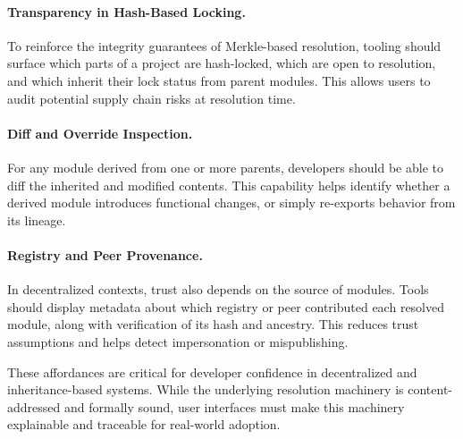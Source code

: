 \documentclass[sigplan,screen]{acmart}
\begin{document}
\paragraph{Transparency in Hash-Based Locking.}
To reinforce the integrity guarantees of Merkle-based resolution, tooling should surface which parts of a project are hash-locked, which are open to resolution, and which inherit their lock status from parent modules. This allows users to audit potential supply chain risks at resolution time.

\paragraph{Diff and Override Inspection.}
For any module derived from one or more parents, developers should be able to diff the inherited and modified contents. This capability helps identify whether a derived module introduces functional changes, or simply re-exports behavior from its lineage.

\paragraph{Registry and Peer Provenance.}
In decentralized contexts, trust also depends on the source of modules. Tools should display metadata about which registry or peer contributed each resolved module, along with verification of its hash and ancestry. This reduces trust assumptions and helps detect impersonation or mispublishing.

These affordances are critical for developer confidence in decentralized and inheritance-based systems. While the underlying resolution machinery is content-addressed and formally sound, user interfaces must make this machinery explainable and traceable for real-world adoption.
\end{document}
